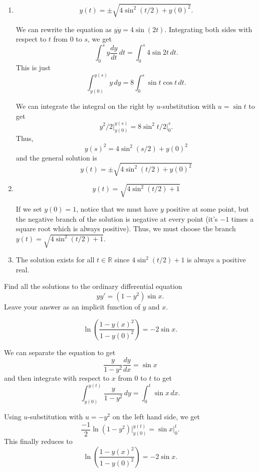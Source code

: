 \documentclass[12 pt, letterpaper]{hmcpset}
\begin{document}
\begin{solution}
	\begin{enumerate}
		\item 
			\[
				\boxed{
					y(t) = \pm \sqrt{4 \sin^{2}{(t/2)} + y(0)^{2}}.
				}
			\]

			We can rewrite the equation as $y \dot{y} = 4 \sin{(2t)}$. Integrating both sides with respect to $t$ from $0$ to $s$, we get
			\[
				\int_{0}^{s} y \frac{dy}{dt} \, dt = \int_{0}^{s} 4 \sin{2t} \, dt.
			\]
			This is just
			\[
				\int_{y(0)}^{y(s)} y \, dy = 8 \int_{0}^{s} \sin{t} \cos{t} \, dt.
			\]

			We can integrate the integral on the right by $u$-substitution with $u = \sin{t}$ to get
			\[
				y^{2}/2 \Big |_{y(0)}^{y(s)} = 8 \sin^{2}{t}/2 \Big |_{0}^{s}.
			\]
			Thus,
			\[
				y(s)^{2} = 4 \sin^{2}(s/2) + y(0)^{2}
			\]
			and the general solution is
			\[
				y(t) = \pm \sqrt{4 \sin^{2}{(t/2)} + y(0)^{2}}
			\]
		\item 
			\[
				\boxed{
					y(t) = \sqrt{4 \sin^{2}{(t/2)} + 1}
				}
			\]

			If we set $y(0) = 1$, notice that we must have $y$ positive at some point, but the negative branch of the solution is negative at every point (it's $-1$ times a square root which is always positive). Thus, we must choose the branch $y(t) = \sqrt{4 \sin^{2}{(t/2)} + 1}$.
		\item The solution exists for all $t \in \mathbb{R}$ since $4 \sin^{2}{(t/2)} + 1$ is always a positive real.
	\end{enumerate}
\end{solution}

\pagebreak

\begin{problem}[3:]
	Find all the solutions to the ordinary differential equation
	\[
		y y' = (1 - y^{2}) \sin{x}.
	\]
	Leave your answer as an implicit function of  $y$ and $x$.
\end{problem}

\begin{solution}
	\[
		\boxed{
			\ln \left ( \frac{1 - y(x)^{2}}{1 - y(0)^{2}} \right ) = -2 \sin{x}.
		}
	\]

	We can separate the equation to get
	\[
		\frac{y}{1 - y^{2}} \frac{dy}{dx} = \sin{x}
	\]
	and then integrate with respect to $x$ from $0$ to $t$ to get
	\[
		\int_{y(0)}^{y(t)} \frac{y}{1 - y^{2}} \, dy = \int_{0}^{t} \sin{x} \, dx.
	\]

	Using $u$-substitution with $u = - y^{2}$ on the left hand side, we get
	\[
		\frac{-1}{2} \ln(1 - y^{2}) \Big |_{y(0)}^{y(t)} = \sin{x} \Big |_{0}^{t}.  
	\]
	This finally reduces to
	\[
		\ln \left ( \frac{1 - y(x)^{2}}{1 - y(0)^{2}} \right ) = -2 \sin{x}.
	\]
\end{solution}
\end{document}
